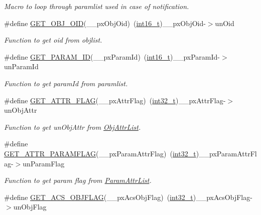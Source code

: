 \begin{DoxyCompactItemize}
\begin{DoxyCompactList}\small\item\em Macro to loop through paramlist used in case of notification. \end{DoxyCompactList}\item 
\#define \hyperlink{group__LIBHELP_ga1fb80edb4b793207ed67ee00d5b4602a}{G\-E\-T\-\_\-\-O\-B\-J\-\_\-\-O\-I\-D}(\-\_\-\-\_\-px\-Obj\-Oid)~(\hyperlink{commondefs_8h_a66634143db08bebe9b46ab4cb1fc6fd3}{int16\-\_\-t})\-\_\-\-\_\-px\-Obj\-Oid-\/$>$un\-Oid
\begin{DoxyCompactList}\small\item\em Function to get oid from objlist. \end{DoxyCompactList}\item 
\#define \hyperlink{group__LIBHELP_gad8507c6ea8c598a30a5765c15cacef9e}{G\-E\-T\-\_\-\-P\-A\-R\-A\-M\-\_\-\-I\-D}(\-\_\-\-\_\-px\-Param\-Id)~(\hyperlink{commondefs_8h_a66634143db08bebe9b46ab4cb1fc6fd3}{int16\-\_\-t})\-\_\-\-\_\-px\-Param\-Id-\/$>$un\-Param\-Id
\begin{DoxyCompactList}\small\item\em Function to get param\-Id from paramlist. \end{DoxyCompactList}\item 
\#define \hyperlink{group__LIBHELP_gab6641a3c2ce085862232038aeb697f4d}{G\-E\-T\-\_\-\-A\-T\-T\-R\-\_\-\-F\-L\-A\-G}(\-\_\-\-\_\-px\-Attr\-Flag)~(\hyperlink{commondefs_8h_a32f2e37ee053cf2ce8ca28d1f74630e5}{int32\-\_\-t})\-\_\-\-\_\-px\-Attr\-Flag-\/$>$un\-Obj\-Attr
\begin{DoxyCompactList}\small\item\em Function to get un\-Obj\-Attr from \hyperlink{structObjAttrList}{Obj\-Attr\-List}. \end{DoxyCompactList}\item 
\#define \hyperlink{group__LIBHELP_ga8f938b41e4074fe9529839745754895c}{G\-E\-T\-\_\-\-A\-T\-T\-R\-\_\-\-P\-A\-R\-A\-M\-F\-L\-A\-G}(\-\_\-\-\_\-px\-Param\-Attr\-Flag)~(\hyperlink{commondefs_8h_a32f2e37ee053cf2ce8ca28d1f74630e5}{int32\-\_\-t})\-\_\-\-\_\-px\-Param\-Attr\-Flag-\/$>$un\-Param\-Flag
\begin{DoxyCompactList}\small\item\em Function to get param flag from \hyperlink{structParamAttrList}{Param\-Attr\-List}. \end{DoxyCompactList}\item 
\#define \hyperlink{group__LIBHELP_gad3d880c849c1b0bfa5e419d322adeba2}{G\-E\-T\-\_\-\-A\-C\-S\-\_\-\-O\-B\-J\-F\-L\-A\-G}(\-\_\-\-\_\-px\-Acs\-Obj\-Flag)~(\hyperlink{commondefs_8h_a32f2e37ee053cf2ce8ca28d1f74630e5}{int32\-\_\-t})\-\_\-\-\_\-px\-Acs\-Obj\-Flag-\/$>$un\-Obj\-Flag

\end{DoxyCompactItemize}
